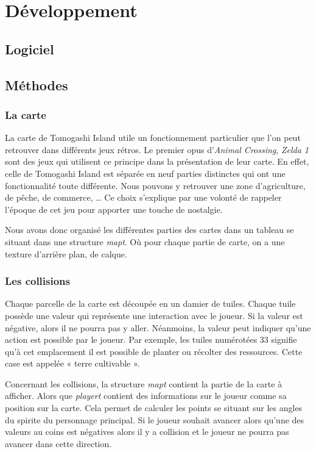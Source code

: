 \documentclass{article}
\begin{document}
\section{Développement}
    \subsection{Logiciel}
    \subsection{Méthodes}
        \subsubsection{La carte}
        La carte de Tomogashi Island utile un fonctionnement particulier que l’on peut retrouver dans différents jeux rétros. Le premier opus d’\textit{Animal Crossing}, \textit{Zelda 1} sont des jeux qui utilisent ce principe dans la présentation de leur carte. En effet, celle de Tomogashi Island  est séparée en neuf parties distinctes qui ont une fonctionnalité toute différente. Nous pouvons y retrouver une zone d’agriculture, de pêche, de commerce, … Ce choix s'explique par une volonté de rappeler l'époque de cet jeu pour apporter une touche de nostalgie.


        Nous avons donc organisé les différentes parties des cartes dans un tableau se situant dans une structure \textit{map\textunderscore t}. Où pour chaque partie de carte, on a une texture d'arrière plan, de calque.
        
        \subsubsection{Les collisions}
        Chaque parcelle de la carte est découpée en un damier de tuiles. Chaque tuile possède une valeur qui représente une interaction avec le joueur. Si la valeur est négative, alors il ne pourra pas y aller. Néanmoins, la valeur peut indiquer qu'une action est possible par le joueur. Par exemple, les tuiles numérotées 33 signifie qu'à cet emplacement il est possible de planter ou récolter des ressources. Cette case est appelée « terre cultivable ».

        Concernant les collisions, la structure \textit{map\textunderscore t} contient la partie de la carte à afficher. Alors que \textit{player\textunderscore t} contient des informations sur le joueur comme sa position sur la carte. Cela permet de calculer les points se situant sur les angles du spirite du personnage principal. Si le joueur souhait avancer alors qu'une des valeurs au coins est négatives alors il y a collision et le joueur ne pourra pas avancer dans cette direction.
\end{document}
